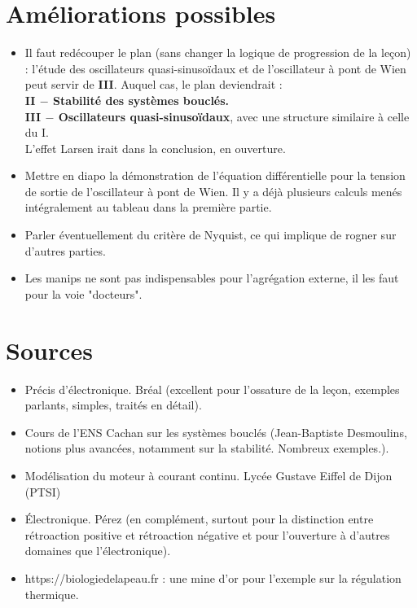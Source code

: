 \documentclass[11pt,a4paper]{report}
\begin{document}
\section*{Améliorations possibles}
\begin{itemize}
	\item Il faut redécouper le plan (sans changer la logique de progression de la leçon) : l'étude des oscillateurs quasi-sinusoïdaux et de l'oscillateur à pont de Wien 
	peut servir de 	\textbf{III}. Auquel cas, le plan deviendrait :\\
 	\textbf{II $-$ Stabilité des systèmes bouclés.}\\
	\textbf{III $-$ Oscillateurs quasi-sinusoïdaux}, avec une structure similaire à celle du I.\\
	L'effet Larsen irait dans la conclusion, en ouverture.\\

	\item Mettre en diapo la démonstration de l'équation différentielle pour la tension de sortie de l'oscillateur à pont de Wien. Il y a déjà plusieurs calculs menés intégralement au tableau dans la première partie.\\

	\item Parler éventuellement du critère de Nyquist, ce qui implique de rogner sur d'autres parties.\\
	
	\item Les manips ne sont pas indispensables pour l'agrégation externe, il les faut pour la voie "docteurs".
\end{itemize}

\section*{Sources}
\begin{itemize}
	\item Précis d'électronique. Bréal (excellent pour l'ossature de la leçon, exemples parlants, simples, traités en détail).\\
	\item Cours de l'ENS Cachan sur les systèmes bouclés (Jean-Baptiste Desmoulins, notions plus avancées, notamment sur la stabilité. Nombreux exemples.).\\
	\item Modélisation du moteur à courant continu. Lycée Gustave Eiffel de Dijon (PTSI)\\
	\item Électronique. Pérez (en complément, surtout pour la distinction entre rétroaction positive et rétroaction négative et pour l'ouverture à d'autres domaines que l'électronique).\\
	\item https://biologiedelapeau.fr : une mine d'or pour l'exemple sur la régulation thermique.
\end{itemize}
\end{document}

